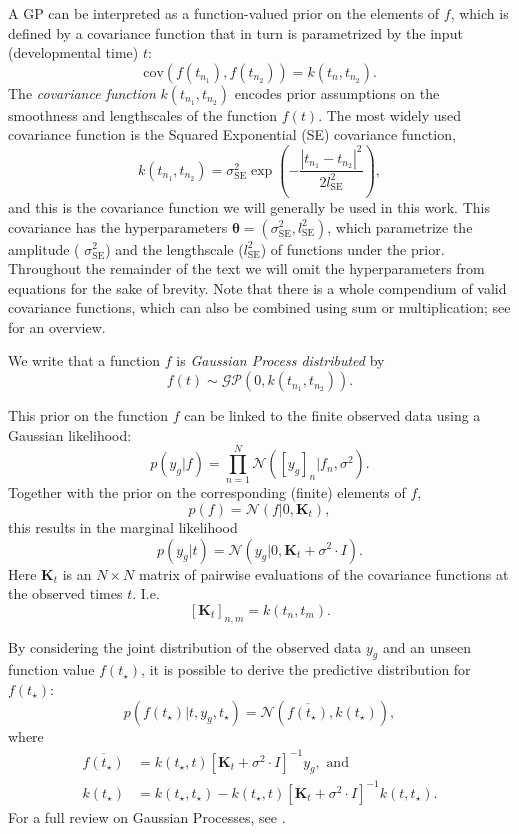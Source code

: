 A GP can be interpreted as a function-valued prior on the elements of $ f $, which is defined by a covariance function that in turn is parametrized by the input (developmental time) $ t $:
\[ \text{cov}(f(t_{n_1}), f(t_{n_2})) = k(t_n, t_{n_2}). \]
The \textit{covariance function} $ k(t_{n_1}, t_{n_2}) $ encodes prior assumptions on the smoothness and lengthscales of the function $ f(t) $. The most widely used covariance function is the Squared Exponential (SE) covariance function,
\begin{equation}
\label{eq:se-kernel}
k(t_{n_1}, t_{n_2}) = 
\sigma_{\text{SE}}^2 \exp \left( - \frac{|t_{n_1} - t_{n_2}|^2}{2l_\text{SE}^2} \right),
\end{equation}
and this is the covariance function we will generally be used in this work.  This covariance has the hyperparameters $ \mathbf{\theta} = (\sigma^2_{\text{SE}}, l^2_\text{SE}) $, which parametrize the amplitude ( $\sigma_{\text{SE}}^2 $) and the lengthscale ($ l^2_{\text{SE}} $) of functions under the prior. Throughout the remainder of the text we will omit the hyperparameters from equations for the sake of brevity. Note that there is a whole compendium of valid covariance functions, which can also be combined using sum or multiplication; see \cite{Williams2006-kb} for an overview.

We write that a function $ f $ is \textit{Gaussian Process distributed} by
\[ f(t) \sim \mathcal{GP}(0, k(t_{n_1}, t_{n_2})). \]

This prior on the function $ f $ can be linked to the finite observed data using a Gaussian likelihood:
\[ p(y_g | f) = \prod_{n=1}^N \mathcal{N} ([y_g]_n | f_{n}, \sigma^2). \]
Together with the prior on the corresponding (finite) elements of $ f $,
\[ p(f) = \mathcal{N}(f | 0, \bm{K}_t), \]
this results in the marginal likelihood
\[ p(y_g | t) = \mathcal{N}(y_g | 0, \bm{K}_t + \sigma^2 \cdot I). \]
Here $ \bm{K}_t $ is an $ N \times N $ matrix of pairwise evaluations of the covariance functions at the observed times $ t $. I.e.
\begin{equation}
\label{eq:covmatrix}
[\bm{K}_t]_{n, m} = k(t_n, t_m).
\end{equation}

By considering the joint distribution of the observed data $ y_g $ and an unseen function value $ f(t_\star) $, it is possible to derive the predictive distribution for $ f(t_\star) $:
\[
p(f(t_\star) | t, y_g, t_\star) = \mathcal{N}\left( \overline{f(t_\star)}, k(t_\star) \right),
\]
where
\begin{align*}
\overline{f(t_\star)} & = k(t_\star, t) [\bm{K}_t + \sigma^2 \cdot I]^{-1} y_g, \text{ and} \\
k(t_\star) & = k(t_\star, t_\star) - k(t_\star, t)[\bm{K}_t + \sigma^2 \cdot I]^{-1} k(t, t_\star).
\end{align*}
For a full review on Gaussian Processes, see \cite{Williams2006-kb}.

